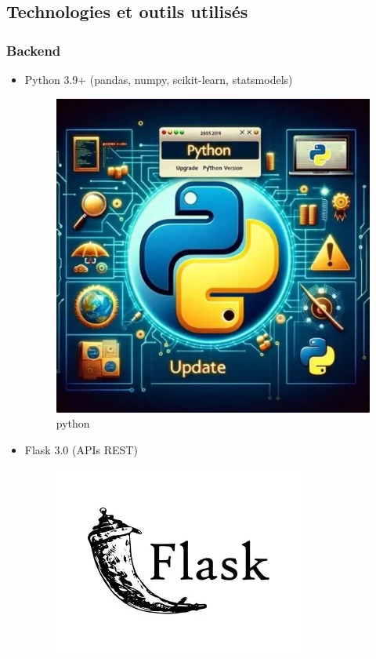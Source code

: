 \subsection{Technologies et outils utilisés}
\subsubsection{Backend}
\begin{itemize}
    \item Python 3.9+ (pandas, numpy, scikit-learn, statsmodels)
    \begin{figure}[H]
    \centering
    \includegraphics[width=\figwidth]{img/Python 3.9+.png}
    \caption{python}
    \label{fig:python}
\end{figure}
    \item Flask 3.0 (APIs REST)
    \begin{figure}[H]
    \centering
    \includegraphics[width=\figwidth]{img/Flask 3.0.png}

\end{figure}
\end{itemize}
